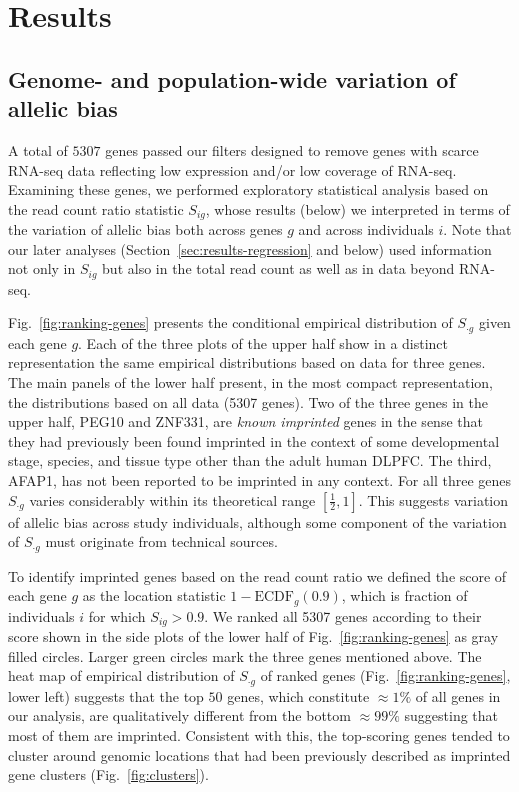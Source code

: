 \documentclass[letterpaper]{article}
\begin{document}
\section{Results}

\subsection{Genome- and population-wide variation of allelic bias}

A total of \(5307\) genes passed our filters designed to remove genes with
scarce RNA-seq data reflecting low expression and/or low coverage of RNA-seq.
Examining these genes, we performed exploratory statistical analysis based on
the read count ratio statistic \(S_{ig}\), whose results (below) we
interpreted in terms of the variation of allelic bias both across genes \(g\)
and across individuals \(i\).  Note that our later analyses
(Section~\ref{sec:results-regression} and below) used
information not only in \(S_{ig}\) but also in the total read count as well as
in data beyond RNA-seq.

Fig.~\ref{fig:ranking-genes} presents the conditional empirical distribution
of \(S_{\cdot g}\) given each gene \(g\).  Each of the three plots of the
upper half show in a distinct representation the same empirical distributions
based on data for three genes.  The main panels of the lower half present, in
the most compact representation, the distributions based on all data (5307
genes).  Two of the three genes in the upper half, PEG10 and ZNF331, are
\emph{known imprinted} genes in the sense that they had previously been found
imprinted in the context of some developmental stage, species, and tissue type
other than the adult human DLPFC.  The third, AFAP1, has not been reported to be imprinted
in any context.  For all three genes \(S_{\cdot g}\) varies considerably
within its theoretical range \([\frac{1}{2}, 1]\).  This suggests variation of
allelic bias across study individuals, although some component of the
variation of \(S_{\cdot g}\) must originate from technical sources.

To identify imprinted genes based on the read count ratio we
defined the score of each gene \(g\) as the location statistic \(1 -
\mathrm{ECDF}_g(0.9)\), which is fraction of
individuals \(i\) for which \(S_{ig}>0.9\).  We ranked all 5307 genes
according to their score shown in the side plots of the lower half of
Fig.~\ref{fig:ranking-genes} as gray filled circles.  Larger green circles
mark the three genes mentioned above.  The heat map of empirical distribution
of \(S_{\cdot g}\) of ranked genes (Fig.~\ref{fig:ranking-genes}, lower left)
suggests that the top \(50\) genes, which constitute \(\approx 1\%\) of all
genes in our analysis, are qualitatively different from the bottom \(\approx
99\%\) suggesting that most of them are imprinted.  Consistent with this, the
top-scoring genes tended to cluster around genomic locations that had been
previously described as imprinted gene clusters (Fig.~\ref{fig:clusters}).
\end{document}
